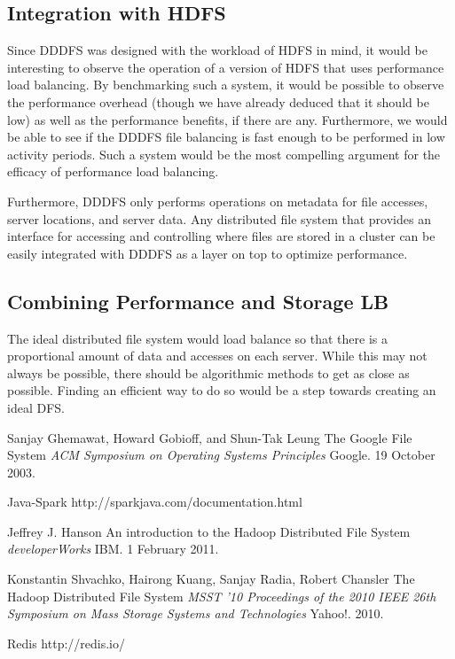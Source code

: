 \documentclass[twoside]{article}
\begin{document}
\begin{multicols}{2}
\subsection*{Integration with HDFS}
Since DDDFS was designed with the workload of HDFS in mind, it would be interesting to observe the operation of a version of HDFS that uses performance load balancing. By benchmarking such a system, it would be possible to observe the performance overhead (though we have already deduced that it should be low) as well as the performance benefits, if there are any. Furthermore, we would be able to see if the DDDFS file balancing is fast enough to be performed in low activity periods. Such a system would be the most compelling argument for the efficacy of performance load balancing.	

Furthermore, DDDFS only performs operations on metadata for file accesses, server locations, and server data. Any distributed file system that provides an interface for accessing and controlling where files are stored in a cluster can be easily integrated with DDDFS as a layer on top to optimize performance. 

\subsection*{Combining Performance and Storage LB}
The ideal distributed file system would load balance so that there is a proportional amount of data and accesses on each server. While this may not always be possible, there should be algorithmic methods to get as close as possible. Finding an efficient way to do so would be a step towards creating an ideal DFS. 

\begin{thebibliography}{99} %

 Sanjay Ghemawat, Howard Gobioff, and Shun-Tak Leung
\newblock The Google File System
\newblock \textit{ACM Symposium on Operating Systems Principles}
\newblock Google. 19 October 2003.

 Java-Spark
\newblock http://sparkjava.com/documentation.html

 Jeffrey J. Hanson
\newblock An introduction to the Hadoop Distributed File System
\newblock \textit{developerWorks}
\newblock IBM. 1 February 2011. 

 Konstantin Shvachko, Hairong Kuang, Sanjay Radia, Robert Chansler
\newblock The Hadoop Distributed File System
\newblock \textit{MSST '10 Proceedings of the 2010 IEEE 26th Symposium on Mass Storage Systems and Technologies}
\newblock Yahoo!. 2010.

 Redis
\newblock http://redis.io/
\end{thebibliography}



\end{multicols}
\end{document}
